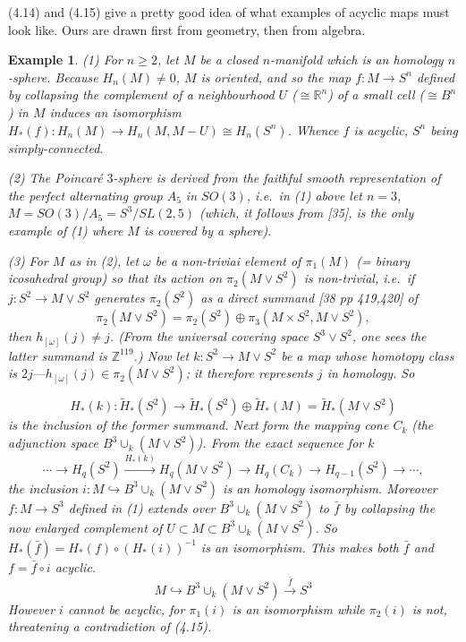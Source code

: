 \documentclass[openany,leqno]{book}  %
\newcommand{\Z}{\mathbb{Z}}
\newcommand{\R}{\mathbb{R}}
\newtheorem{ex}[theorem]{Example}
\begin{document}
(4.14) and (4.15) give a pretty good idea of what examples of acyclic maps must look like.
Ours are drawn first from geometry, then from algebra.
\begin{ex}
	(1) For $n \geqslant 2$, let $M$ be a closed $n$-manifold which is an homology $n$-sphere. Because $H_n(M) \neq 0$, $M$ is oriented, and so the map $f \colon    M \longrightarrow S^n$ defined by collapsing the complement of a neighbourhood $U$ ($\cong \R^n$) of a small cell ($\cong B^n$) in $M$ induces an isomorphism
$H_*(f) \colon   H_n(M) \longrightarrow H_n(M, M-U) \cong H_n(S^n)$. Whence $f$ is acyclic, $S^n$ being simply-connected.

(2) The Poincar\'e $3$-sphere is derived from the faithful smooth representation of the perfect alternating group $A_5$  in $SO(3)$, i.e.\  in (1) above let $n = 3$, $M = SO(3)/A_5 = S^3/SL(2,5)$ (which, it follows from [35], is the only example of (1) where $M$ is covered by a sphere).

(3) For $M$ as in (2), let $\omega$ be a non-triviai element of $\pi_1(M)$ (= binary icosahedral group) so that its action on $\pi_2(M\vee S^2)$ is non-trivial, i.e.\  if $j \colon    S^2 \longrightarrow M\vee S^2$ generates $\pi_2(S^2)$ as a direct summand [38 pp 419,420] of
\[\pi_2(M\vee S^2) = \pi_2(S^2) \oplus \pi_3(M\times S^2, M\vee S^2), \]
then $h_{[\omega]}(j)\neq j$. (From the universal covering space $S^3 \vee  S^2$, one sees the latter summand is $\Z^{119}$.) Now let $k\colon  S^2 \longrightarrow M\vee S^2$ be a map whose homotopy class is $2j—h_{[\omega]}(j)\in \pi_2(M\vee S^2)$; it therefore represents $j$ in homology. So

\[H_*(k) \colon   \widetilde{H}_*(S^2)\longrightarrow \widetilde{H}_*(S^2) \oplus \widetilde{H}_*(M) = \widetilde{H}_*(M\vee S^2)\]
is the inclusion of the former summand. Next form the mapping cone $C_k$ (the adjunction space $B^3\cup_k (M\vee S^2)$). From the exact sequence for $k$ 
\[
\cdots \longrightarrow H_q(S^2) \overset{H_*(k)}\longrightarrow H_q(M\vee S^2) \longrightarrow H_q(C_k)\longrightarrow H_{q-1}(S^2)\longrightarrow \cdots ,\] 
the inclusion $i\colon   M\hookrightarrow B^3\cup_k (M\vee S^2)$ is an homology isomorphism. Moreover $f\colon   M \longrightarrow S^3$ defined in (1) extends over $B^3\cup_k (M\vee S^2)$ to $\bar{f}$ by collapsing the now enlarged complement of $U \subset M \subset B^3\cup_k (M\vee S^2)$. So $H_*(\bar{f})= H_*(f)\circ(H_*(i))^{-1}$ is an isomorphism. This makes both $\bar{f}$ and $f = \bar{f} \circ i$ acyclic.
\[M \hookrightarrow B^3\cup_k (M\vee S^2) \overset{\bar{f}}\longrightarrow S^3\]
However $i$ cannot be acyclic, for $\pi_1(i)$ is an isomorphism while $\pi_2(i)$ is not, threatening a contradiction of (4.15).


\end{ex}
\end{document}
